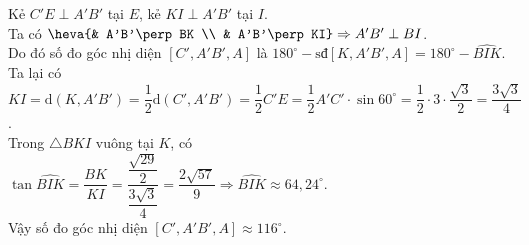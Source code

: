\begin{ex}
{		Kẻ $C'E \perp A'B'$ tại $E$, kẻ $KI \perp A'B'$ tại $I$.\\
		Ta có $\heva{& A'B'\perp BK \\ & A'B'\perp KI}\Rightarrow A'B'\perp BI$.\\
		Do đó số đo góc nhị diện $[C',A'B',A]$ là $180^{\circ}-\text{sđ}[K,A'B',A]=180^{\circ}-\widehat{BIK}$.\\
		Ta lại có $KI=\mathrm{d}(K,A'B')=\dfrac{1}{2}\mathrm{d}(C',A'B')=\dfrac{1}{2}C'E = \dfrac{1}{2}A'C' \cdot \sin 60^{\circ} = \dfrac{1}{2}\cdot 3 \cdot \dfrac{\sqrt{3}}{2} = \dfrac{3\sqrt{3}}{4}$.\\
		Trong $\triangle BKI$ vuông tại $K$, có $\tan\widehat{BIK}=\dfrac{BK}{KI}=\dfrac{\dfrac{\sqrt{29}}{2}}{\dfrac{3\sqrt{3}}{4}}=\dfrac{2\sqrt{57}}{9}\Rightarrow \widehat{BIK}\approx 64{,}24^{\circ}$.\\
		Vậy số đo góc nhị diện $[C',A'B',A]\approx 116^{\circ}$.
	}
\end{ex}


